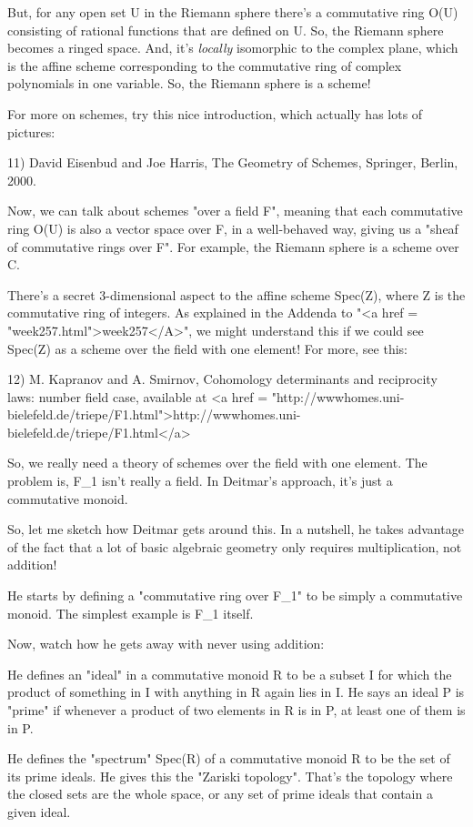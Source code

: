 But, for any open set U in the Riemann sphere there's a commutative
ring O(U) consisting of rational functions that are defined on U.  So,
the Riemann sphere becomes a ringed space.  And, it's \emph{locally}
isomorphic to the complex plane, which is the affine scheme
corresponding to the commutative ring of complex polynomials in one
variable.  So, the Riemann sphere is a scheme!

For more on schemes, try this nice introduction, which actually
has lots of pictures:

11) David Eisenbud and Joe Harris, 
The Geometry of Schemes, Springer, Berlin, 2000.

Now, we can talk about schemes "over a field F", meaning
that each commutative ring O(U) is also a vector space over F, in a
well-behaved way, giving us a "sheaf of commutative rings over
F".  For example, the Riemann sphere is a scheme over C.

There's a secret 3-dimensional aspect to the affine scheme Spec(Z),
where Z is the commutative ring of integers.  As explained in the
Addenda to "<a href = "week257.html">week257</A>", we might
understand this if we could see Spec(Z) as a scheme over the field
with one element!  For more, see this:

12) M. Kapranov and A. Smirnov, Cohomology determinants and 
reciprocity laws: number field case, available at 
<a href = "http://wwwhomes.uni-bielefeld.de/triepe/F1.html">http://wwwhomes.uni-bielefeld.de/triepe/F1.html</a>

So, we really need a theory of schemes over the field with one
element.  The problem is, F_{1} isn't really a field.  In
Deitmar's approach, it's just a commutative monoid.

So, let me sketch how Deitmar gets around this.  In a nutshell, he takes
advantage of the fact that a lot of basic algebraic geometry only requires 
multiplication, not addition!

He starts by defining a "commutative ring over
F_{1}" to be simply a commutative monoid.  The simplest
example is F_{1} itself.

Now, watch how he gets away with never using addition:

He defines an "ideal" in a commutative monoid R to be a
subset I for which the product of something in I with anything in R
again lies in I.  He says an ideal P is "prime" if whenever
a product of two elements in R is in P, at least one of them is in P.

He defines the "spectrum" Spec(R) of a commutative monoid R
to be the set of its prime ideals.  He gives this the "Zariski
topology".  That's the topology where the closed sets are the
whole space, or any set of prime ideals that contain a given ideal.

